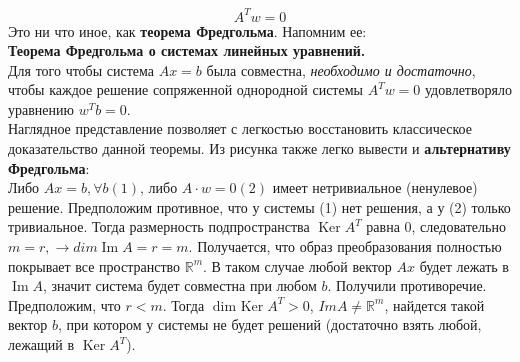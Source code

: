 \documentclass[a4paper,12pt]{article}
\begin{document}
\[ A^T w = 0\]
Это ни что иное, как \textbf{теорема Фредгольма}. Напомним ее: \\
\textbf{Теорема Фредгольма о системах линейных уравнений.}\\
Для того чтобы система $Ax = b$ была совместна, \textit{необходимо и достаточно}, чтобы каждое решение сопряженной однородной системы $A^Tw = 0$ удовлетворяло уравнению $w^Tb = 0$. \\
Наглядное представление позволяет с легкостью восстановить классическое доказательство данной теоремы. Из рисунка также легко вывести и \textbf{альтернативу Фредгольма}: \\ Либо $Ax = b, \forall b (1)$, либо $A \cdot w = 0 (2)$ имеет нетривиальное (ненулевое) решение. 
Предположим противное, что у системы (1) нет решения, а у (2) только тривиальное. Тогда размерность подпространства $\operatorname{Ker} A^T$ равна 0, следовательно $m = r, \rightarrow dim \operatorname{Im} A = r = m.$ Получается, что образ преобразования полностью покрывает все пространство $\mathbb{R}^m$. В таком случае любой вектор $Ax$ будет лежать в $\operatorname{Im} A$, значит система будет совместна при любом $b$. Получили противоречие. \\
Предположим, что $r < m$. Тогда $\operatorname{dim \ Ker} A^T > 0$, $Im A \neq \mathbb{R}^m$, найдется такой вектор $b$, при котором у системы не будет решений (достаточно взять любой, лежащий в $\operatorname{Ker} A^T$). 
\end{document}
